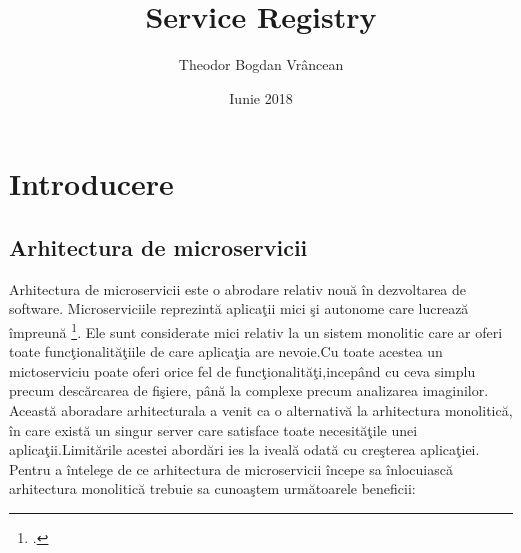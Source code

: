 \documentclass[a4paper,12pt]{report}
\title{Service Registry}
\author{Theodor Bogdan Vr\^ancean}
\date {Iunie 2018}
\begin{document}
\maketitle
\tableofcontents
\chapter{Introducere}
\section{Arhitectura de microservicii}

Arhitectura de microservicii este o abrodare relativ nou\u a \^ in dezvoltarea de software.
Microserviciile reprezint\u a aplica\c tii mici \c si autonome care lucreaz\u a \^ impreun\u a
\footcite{buildingMicroservices}. Ele sunt considerate mici relativ la un sistem monolitic care ar
oferi toate func\c tionalit\u a\c tiile de care aplica\c tia are nevoie.Cu toate acestea un mictoserviciu poate oferi orice
fel de func\c tionalit\u a\c ti,incep\^and cu ceva simplu precum desc\u arcarea de fi\c siere, p\^an\u a la
complexe precum analizarea imaginilor.
Aceast\u a aboradare arhitecturala a venit ca o alternativ\u a la arhitectura monolitic\u a, \^in care exist\u a
un singur server care satisface toate necesit\u a\c tile unei aplica\c tii.Limit\u arile acestei abord\u ari ies la iveal\u a
odat\u a cu cre\c sterea aplica\c tiei.
Pentru a \^intelege de ce arhitectura  de microservicii \^incepe sa \^inlocuiasc\u a arhitectura monolitic\u a 
trebuie sa cunoa\c stem urm\u atoarele beneficii:
\end{document}
